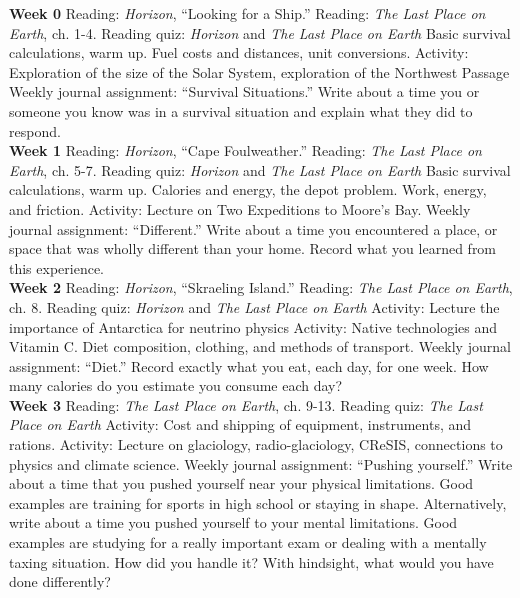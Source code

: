 \documentclass[10pt]{article}
\begin{document}
\begin{outline}[enumerate]
\1 \textbf{Week 0}
\2 Reading: \textit{Horizon}, ``Looking for a Ship.''
\2 Reading: \textit{The Last Place on Earth}, ch. 1-4.
\2 Reading quiz: \textit{Horizon} and \textit{The Last Place on Earth}
\2 Basic survival calculations, warm up.  Fuel costs and distances, unit conversions.
\2 Activity: Exploration of the size of the Solar System, exploration of the Northwest Passage
\2 Weekly journal assignment: ``Survival Situations.'' Write about a time you or someone you know was in a survival situation and explain what they did to respond. \\
\1\textbf{Week 1}
\2 Reading: \textit{Horizon}, ``Cape Foulweather.''
\2 Reading: \textit{The Last Place on Earth}, ch. 5-7.
\2 Reading quiz: \textit{Horizon} and \textit{The Last Place on Earth}
\2 Basic survival calculations, warm up.  Calories and energy, the depot problem.  Work, energy, and friction.
\2 Activity: Lecture on Two Expeditions to Moore's Bay.
\2 Weekly journal assignment: ``Different.''  Write about a time you encountered a place, or space that was wholly different than your home.  Record what you learned from this experience. \\
\1 \textbf{Week 2}
\2 Reading: \textit{Horizon}, ``Skraeling Island.''
\2 Reading: \textit{The Last Place on Earth}, ch. 8.
\2 Reading quiz: \textit{Horizon} and \textit{The Last Place on Earth}
\2 Activity: Lecture the importance of Antarctica for neutrino physics
\2 Activity: Native technologies and Vitamin C.  Diet composition, clothing, and methods of transport.
\2 Weekly journal assignment: ``Diet.''  Record exactly what you eat, each day, for one week.  How many calories do you estimate you consume each day? \\
\1 \textbf{Week 3}
\2 Reading: \textit{The Last Place on Earth}, ch. 9-13.
\2 Reading quiz: \textit{The Last Place on Earth}
\2 Activity: Cost and shipping of equipment, instruments, and rations.
\2 Activity: Lecture on glaciology, radio-glaciology, CReSIS, connections to physics and climate science.
\2 Weekly journal assignment: ``Pushing yourself.''  Write about a time that you pushed yourself near your physical limitations.  Good examples are training for sports in high school or staying in shape.  Alternatively, write about a time you pushed yourself to your mental limitations.  Good examples are studying for a really important exam or dealing with a mentally taxing situation.  How did you handle it?  With hindsight, what would you have done differently? \\

\end{outline}
\end{document}
